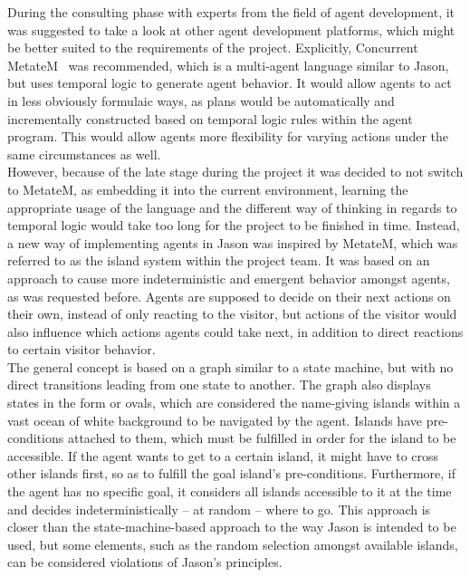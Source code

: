 \documentclass[draft,final]{vutinfth} %
\begin{document}
During the consulting phase with experts from the field of agent development, it was suggested to take a look at other agent development platforms, which might be better suited to the requirements of the project.
Explicitly, Concurrent MetateM~\cite{Barringer1995} was recommended, which is a multi-agent language similar to Jason, but uses temporal logic to generate agent behavior. 
It would allow agents to act in less obviously formulaic ways, as plans would be automatically and incrementally constructed based on temporal logic rules within the agent program. 
This would allow agents more flexibility for varying actions under the same circumstances as well. \\
However, because of the late stage during the project it was decided to not switch to MetateM, as embedding it into the current environment, learning the appropriate usage of the language and the different way of thinking in regards to temporal logic would take too long for the project to be finished in time. 
Instead, a new way of implementing agents in Jason was inspired by MetateM, which was referred to as the \gls{island system} within the project team. 
It was based on an approach to cause more indeterministic and emergent behavior amongst agents, as was requested before. 
Agents are supposed to decide on their next actions on their own, instead of only reacting to the \gls{visitor}, but actions of the \gls{visitor} would also influence which actions agents could take next, in addition to direct reactions to certain \gls{visitor} behavior. \\
The general concept is based on a graph similar to a state machine, but with no direct transitions leading from one state to another. 
The graph also displays states in the form or ovals, which are considered the name-giving islands within a vast ocean of white background to be navigated by the agent. 
Islands have pre-conditions attached to them, which must be fulfilled in order for the island to be accessible. 
If the agent wants to get to a certain island, it might have to cross other islands first, so as to fulfill the goal island’s pre-conditions. 
Furthermore, if the agent has no specific goal, it considers all islands accessible to it at the time and decides indeterministically – at random – where to go. 
This approach is closer than the state-machine-based approach to the way Jason is intended to be used, but some elements, such as the random selection amongst available islands, can be considered violations of Jason’s principles. \\
\end{document}
